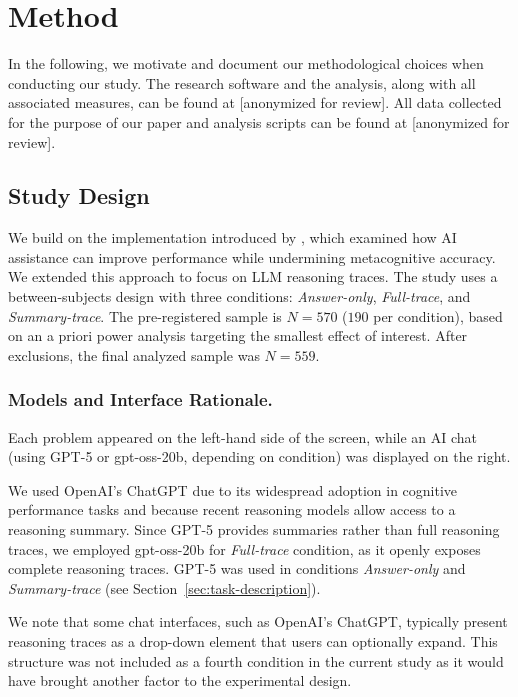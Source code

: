 \documentclass[manuscript, anonymous=false,authorversion,review=false]{acmart}
\begin{document}
\section{Method}

In the following, we motivate and document our methodological choices when conducting our study. The research software and the analysis, along with all associated measures, can be found at [anonymized for review]. All data collected for the purpose of our paper and analysis scripts can be found at [anonymized for review].

\subsection{Study Design}
We build on the implementation introduced by \citet{FERNANDES2026108779}, which examined how AI assistance can improve performance while undermining metacognitive accuracy. We extended this approach to focus on LLM reasoning traces. 
The study uses a between-subjects design with three conditions: \textit{Answer-only}, \textit{Full-trace}, and \textit{Summary-trace}. The pre-registered sample is $N=570$ ($190$ per condition), based on an a priori power analysis targeting the smallest effect of interest. After exclusions, the final analyzed sample was $N=559$.%


\subsubsection{Models and Interface Rationale.}
Each problem appeared on the left-hand side of the screen, while an AI chat (using GPT-5 or gpt-oss-20b, depending on condition) was displayed on the right. 

We used OpenAI's ChatGPT due to its widespread adoption in cognitive performance tasks \cite{bastani2024generative,draxlerghost24,draxler2023gender} and because recent reasoning models allow access to a reasoning summary. Since GPT-5 provides summaries rather than full reasoning traces, we employed gpt-oss-20b for \textit{Full-trace} condition, as it openly exposes complete reasoning traces. GPT-5 was used in conditions \textit{Answer-only} and \textit{Summary-trace} (see Section~\ref{sec:task-description}).

We note that some chat interfaces, such as OpenAI's ChatGPT, typically present reasoning traces as a drop-down element that users can optionally expand. This structure was not included as a fourth condition in the current study as it would have brought another factor to the experimental design. 
\end{document}
